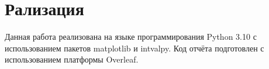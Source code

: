 \section{Рализация}
Данная работа реализована на языке программирования Python 3.10 с использованием пакетов matplotlib и intvalpy. Код отчёта подготовлен с использованием платформы Overleaf.
